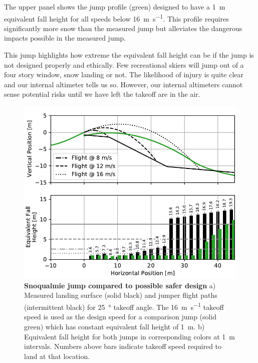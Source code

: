 \documentclass{article}
\begin{document}
The upper panel shows the jump profile (green) designed to have a 1~\si{\meter}
equivalent fall height for all speeds below 16~\si{\meter\per\second}. This
profile requires significantly more snow than the measured jump but alleviates
the dangerous impacts possible in the measured jump.

This jump highlights how extreme the equivalent fall height can be if the jump
is not designed properly and ethically. Few recreational skiers will jump out
of a four story window, snow landing or not. The likelihood of injury is quite
clear and our internal altimeter tells us so. However, our internal altimeters
cannot sense potential risks until we have left the takeoff are in the air.
%

\begin{figure}
  \centering
  \includegraphics[width=5.25in]{figures/salvini-v-snoqualmie.pdf}
  \caption{\textbf{Snoqualmie jump compared to possible safer design}
  a) Measured landing surface (solid black) and jumper flight paths (intermittent
  black) for 25~\si{\degree} takeoff angle. The
  16~\si{\meter\per\second} takeoff speed is used as the design speed for a comparison
  jump (solid green) which has constant equivalent fall height of 1~\si{\meter}.
  b) Equivalent fall height for both jumps
  in corresponding colors at 1~\si{\meter} intervals. Numbers above
  bars indicate takeoff speed required
  to land at that location. 
  }
  \label{fig:salvini-v-snoqualmie}
\end{figure}
\end{document}
